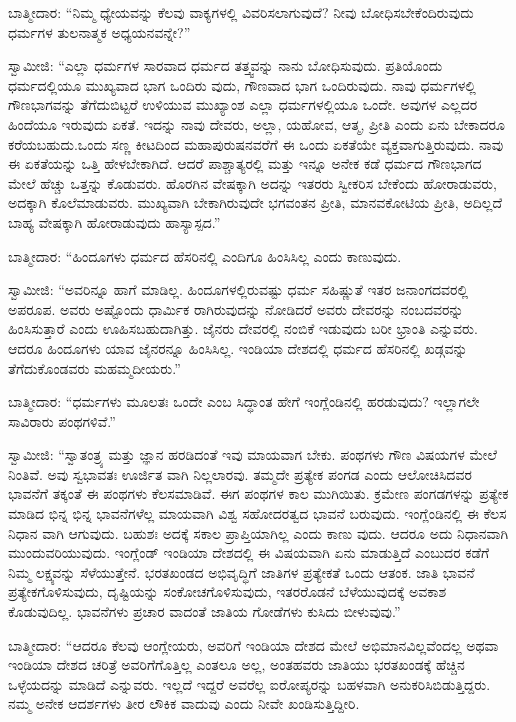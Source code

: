 ಬಾತ್ಮೀದಾರ: “ನಿಮ್ಮ ಧ್ಯೇಯವನ್ನು ಕೆಲವು ವಾಕ್ಯಗಳಲ್ಲಿ ವಿವರಿಸಲಾಗುವುದೆ? ನೀವು ಬೋಧಿಸಬೇಕೆಂದಿರುವುದು ಧರ್ಮಗಳ ತುಲನಾತ್ಮಕ ಅಧ್ಯಯನವನ್ನೇ?”

ಸ್ವಾಮೀಜಿ: “ಎಲ್ಲಾ ಧರ್ಮಗಳ ಸಾರವಾದ ಧರ್ಮದ ತತ್ತ್ವವನ್ನು ನಾನು ಬೋಧಿಸುವುದು. ಪ್ರತಿಯೊಂದು ಧರ್ಮದಲ್ಲಿಯೂ ಮುಖ್ಯವಾದ ಭಾಗ ಒಂದಿರು ವುದು, ಗೌಣವಾದ ಭಾಗ ಒಂದಿರುವುದು. ನಾವು ಧರ್ಮಗಳಲ್ಲಿ ಗೌಣಭಾಗವನ್ನು ತೆಗೆದುಬಿಟ್ಟರೆ ಉಳಿಯುವ ಮುಖ್ಯಾಂಶ ಎಲ್ಲಾ ಧರ್ಮಗಳಲ್ಲಿಯೂ ಒಂದೇ. ಅವುಗಳ ಎಲ್ಲದರ ಹಿಂದೆಯೂ ಇರುವುದು ಏಕತೆ. ಇದನ್ನು ನಾವು ದೇವರು, ಅಲ್ಲಾ, ಯಹೋವ, ಆತ್ಮ, ಪ್ರೀತಿ ಎಂದು ಏನು ಬೇಕಾದರೂ ಕರೆಯಬಹುದು.ಒಂದು ಸಣ್ಣ ಕೀಟದಿಂದ ಮಹಾಪುರುಷನವರೆಗೆ ಈ ಒಂದು ಏಕತೆಯೇ ವ್ಯಕ್ತವಾಗುತ್ತಿರುವುದು. ನಾವು ಈ ಏಕತೆಯನ್ನು ಒತ್ತಿ ಹೇಳಬೇಕಾಗಿದೆ. ಆದರೆ ಪಾಶ್ಚಾತ್ಯರಲ್ಲಿ ಮತ್ತು ಇನ್ನೂ ಅನೇಕ ಕಡೆ ಧರ್ಮದ ಗೌಣಭಾಗದ ಮೇಲೆ ಹೆಚ್ಚು ಒತ್ತನ್ನು ಕೊಡುವರು. ಹೊರಗಿನ ವೇಷಕ್ಕಾಗಿ ಅದನ್ನು ಇತರರು ಸ್ವೀಕರಿಸ ಬೇಕೆಂದು ಹೋರಾಡುವರು, ಅದಕ್ಕಾಗಿ ಕೊಲೆಮಾಡುವರು. ಮುಖ್ಯವಾಗಿ ಬೇಕಾಗಿರುವುದೇ ಭಗವಂತನ ಪ್ರೀತಿ, ಮಾನವಕೋಟಿಯ ಪ್ರೀತಿ, ಅದಿಲ್ಲದೆ ಬಾಹ್ಯ ವೇಷಕ್ಕಾಗಿ ಹೋರಾಡುವುದು ಹಾಸ್ಯಾಸ್ಪದ.”

ಬಾತ್ಮೀದಾರ: “ಹಿಂದೂಗಳು ಧರ್ಮದ ಹೆಸರಿನಲ್ಲಿ ಎಂದಿಗೂ ಹಿಂಸಿಸಿಲ್ಲ ಎಂದು ಕಾಣುವುದು.

ಸ್ವಾಮೀಜಿ: “ಅವರಿನ್ನೂ ಹಾಗೆ ಮಾಡಿಲ್ಲ. ಹಿಂದೂಗಳಲ್ಲಿರುವಷ್ಟು ಧರ್ಮ ಸಹಿಷ್ಣುತೆ ಇತರ ಜನಾಂಗದವರಲ್ಲಿ ಅಪರೂಪ. ಅವರು ಅಷ್ಟೊಂದು ಧಾರ್ಮಿಕ ರಾಗಿರುವುದನ್ನು ನೋಡಿದರೆ ಅವರು ದೇವರನ್ನು ನಂಬದವರನ್ನು ಹಿಂಸಿಸುತ್ತಾರೆ ಎಂದು ಊಹಿಸಬಹುದಾಗಿತ್ತು. ಜೈನರು ದೇವರಲ್ಲಿ ನಂಬಿಕೆ ಇಡುವುದು ಬರೀ ಭ್ರಾಂತಿ ಎನ್ನುವರು. ಆದರೂ ಹಿಂದೂಗಳು ಯಾವ ಜೈನರನ್ನೂ ಹಿಂಸಿಸಿಲ್ಲ. ಇಂಡಿಯಾ ದೇಶದಲ್ಲಿ ಧರ್ಮದ ಹೆಸರಿನಲ್ಲಿ ಖಡ್ಗವನ್ನು ತೆಗೆದುಕೊಂಡವರು ಮಹಮ್ಮದೀಯರು.”

ಬಾತ್ಮೀದಾರ: “ಧರ್ಮಗಳು ಮೂಲತಃ ಒಂದೇ ಎಂಬ ಸಿದ್ಧಾಂತ ಹೇಗೆ ಇಂಗ್ಲೆಂಡಿನಲ್ಲಿ ಹರಡುವುದು? ಇಲ್ಲಾಗಲೇ ಸಾವಿರಾರು ಪಂಥಗಳಿವೆ.”

ಸ್ವಾಮೀಜಿ: “ಸ್ವಾತಂತ್ರ್ಯ ಮತ್ತು ಜ್ಞಾನ ಹರಡಿದಂತೆ ಇವು ಮಾಯವಾಗ ಬೇಕು. ಪಂಥಗಳು ಗೌಣ ವಿಷಯಗಳ ಮೇಲೆ ನಿಂತಿವೆ. ಅವು ಸ್ವಭಾವತಃ ಊರ್ಜಿತ ವಾಗಿ ನಿಲ್ಲಲಾರವು. ತಮ್ಮದೇ ಪ್ರತ್ಯೇಕ ಪಂಗಡ ಎಂದು ಆಲೋಚಿಸಿದವರ ಭಾವನೆಗೆ ತಕ್ಕಂತೆ ಈ ಪಂಥಗಳು ಕೆಲಸಮಾಡಿವೆ. ಈಗ ಪಂಥಗಳ ಕಾಲ ಮುಗಿಯಿತು. ಕ್ರಮೇಣ ಪಂಗಡಗಳನ್ನು ಪ್ರತ್ಯೇಕ ಮಾಡಿದ ಭಿನ್ನ ಭಿನ್ನ ಭಾವನೆಗಳೆಲ್ಲ ಮಾಯವಾಗಿ ವಿಶ್ವ ಸಹೋದರತ್ವದ ಭಾವನೆ ಬರುವುದು. ಇಂಗ್ಲೆಂಡಿನಲ್ಲಿ ಈ ಕೆಲಸ ನಿಧಾನ ವಾಗಿ ಆಗುವುದು. ಬಹುಶಃ ಅದಕ್ಕೆ ಸಕಾಲ ಪ್ರಾಪ್ತಿಯಾಗಿಲ್ಲ ಎಂದು ಕಾಣು ವುದು. ಆದರೂ ಅದು ನಿಧಾನವಾಗಿ ಮುಂದುವರಿಯುವುದು. ಇಂಗ್ಲೆಂಡ್​ ಇಂಡಿಯಾ ದೇಶದಲ್ಲಿ ಈ ವಿಷಯವಾಗಿ ಏನು ಮಾಡುತ್ತಿದೆ ಎಂಬುದರ ಕಡೆಗೆ ನಿಮ್ಮ ಲಕ್ಷ್ಯವನ್ನು ಸೆಳೆಯುತ್ತೇನೆ. ಭರತಖಂಡದ ಅಭಿವೃದ್ಧಿಗೆ ಜಾತಿಗಳ ಪ್ರತ್ಯೇಕತೆ ಒಂದು ಆತಂಕ. ಜಾತಿ ಭಾವನೆ ಪ್ರತ್ಯೇಕಗೊಳಿಸುವುದು, ದೃಷ್ಟಿಯನ್ನು ಸಂಕೋಚಗೊಳಿಸುವುದು, ಇತರರೊಡನೆ ಬೆಳೆಯುವುದಕ್ಕೆ ಅವಕಾಶ ಕೊಡುವುದಿಲ್ಲ. ಭಾವನೆಗಳು ಪ್ರಚಾರ ವಾದಂತೆ ಜಾತಿಯ ಗೋಡೆಗಳು ಕುಸಿದು ಬೀಳುವುವು.”

ಬಾತ್ಮೀದಾರ: “ಆದರೂ ಕೆಲವು ಆಂಗ್ಲೇಯರು, ಅವರಿಗೆ ಇಂಡಿಯಾ ದೇಶದ ಮೇಲೆ ಅಭಿಮಾನವಿಲ್ಲವೆಂದಲ್ಲ ಅಥವಾ ಇಂಡಿಯಾ ದೇಶದ ಚರಿತ್ರೆ ಅವರಿಗೆಗೊತ್ತಿಲ್ಲ ಎಂತಲೂ ಅಲ್ಲ, ಅಂತಹವರು ಜಾತಿಯು ಭರತಖಂಡಕ್ಕೆ ಹೆಚ್ಚಿನ ಒಳ್ಳೆಯದನ್ನು ಮಾಡಿದೆ ಎನ್ನುವರು. ಇಲ್ಲದೆ ಇದ್ದರೆ ಅವರೆಲ್ಲ ಐರೋಪ್ಯರನ್ನು ಬಹಳವಾಗಿ ಅನುಕರಿಸಿಬಿಡುತ್ತಿದ್ದರು. ನಮ್ಮ ಅನೇಕ ಆದರ್ಶಗಳು ತೀರ ಲೌಕಿಕ ವಾದುವು ಎಂದು ನೀವೇ ಖಂಡಿಸುತ್ತಿದ್ದೀರಿ.

